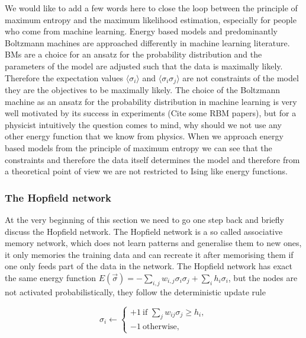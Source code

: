 \documentclass[nofootinbib, superscriptaddress, prl]{revtex4}
\begin{document}
We would like to add a few words here to close the loop between the principle of maximum entropy and the maximum likelihood estimation, especially for people who come from machine learning.
Energy based models and predominantly Boltzmann machines are approached differently in machine learning literature. BMs are a choice for an ansatz for the probability distribution and the parameters of the model are adjusted such that the data is maximally likely. Therefore the expectation values $\langle \sigma_i \rangle$ and  $\langle \sigma_i \sigma_j \rangle$ are not constraints of the model they are the objectives to be maximally likely.
The choice of the Boltzmann machine as an ansatz for the probability distribution in machine learning is very well motivated by its success in experiments (Cite some RBM papers), but for a physicist intuitively the question comes to mind, why should we not use any other energy function that we know from physics. When we approach energy based models from the principle of maximum entropy we can see that the constraints and therefore the data itself determines the model and therefore from a theoretical point of view we are not restricted to Ising like energy functions.

\subsubsection{The Hopfield network}

At the very beginning of this section we need to go one step back and briefly discuss the Hopfield network. The Hopfield network is a so called associative memory network, which does not learn patterns and generalise them to new ones, it only memories the training data and can recreate it after memorising them if one only feeds part of the data in the network. The Hopfield network has exact the same energy function $E(\vec {\sigma}) = -\sum_{i,j} w_{i,j} \sigma_i \sigma_j + \sum_i h_i \sigma_i$, but the nodes are not activated probabilistically, they follow the deterministic update rule

\begin{equation}
	\sigma_{i}\leftarrow \left\{{\begin{array}{ll}+1~{\mbox{if }}\sum _{{j}}{w_{{ij}}\sigma_{j}}\geq h _{i},\\-1~{\mbox{otherwise,}}\end{array}}\right.
\end{equation}
\end{document}
